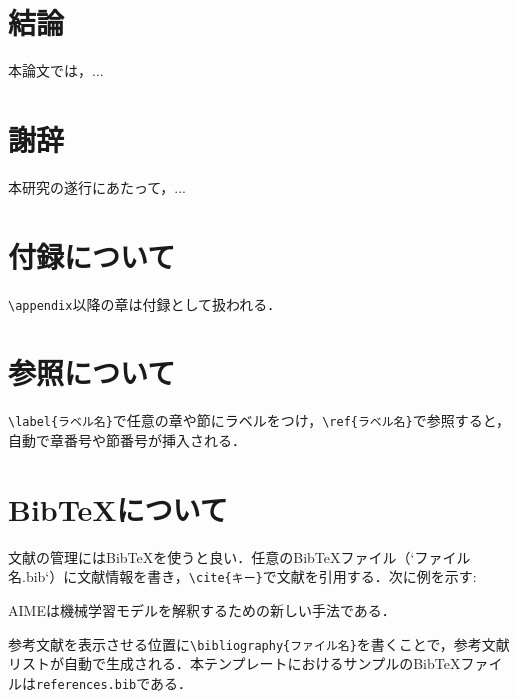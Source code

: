 \documentclass[titlepage,12pt]{ltjsarticle}
\begin{document}
\section{結論}\label{sec:conclusion}
本論文では，...

\section*{謝辞}
本研究の遂行にあたって，...




\appendix
\section{付録について}\label{app:appendix}
\texttt{\textbackslash{}appendix}以降の章は付録として扱われる．

\section{参照について}\label{app:ref}
\texttt{\textbackslash{}label\{ラベル名\}}で任意の章や節にラベルをつけ，\texttt{\textbackslash{}ref\{ラベル名\}}で参照すると，自動で章番号や節番号が挿入される．

\section{BibTeXについて}\label{app:bibtex}
文献の管理にはBibTeXを使うと良い．任意のBibTeXファイル（`ファイル名.bib`）に文献情報を書き，\texttt{\textbackslash{}cite\{キー\}}で文献を引用する．次に例を示す:

AIME\cite{AIME}は機械学習モデルを解釈するための新しい手法である．

参考文献を表示させる位置に\texttt{\textbackslash{}bibliography\{ファイル名\}}を書くことで，参考文献リストが自動で生成される．本テンプレートにおけるサンプルのBibTeXファイルは\texttt{references.bib}である．
\end{document}
